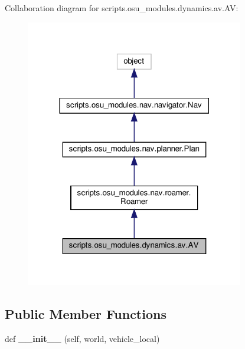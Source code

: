 Collaboration diagram for scripts.\+osu\+\_\+modules.\+dynamics.\+av.\+AV\+:
\nopagebreak
\begin{figure}[H]
\begin{center}
\leavevmode
\includegraphics[width=269pt]{d5/db2/classscripts_1_1osu__modules_1_1dynamics_1_1av_1_1AV__coll__graph}
\end{center}
\end{figure}
\subsection*{Public Member Functions}
\begin{DoxyCompactItemize}
\item 
\mbox{\label{classscripts_1_1osu__modules_1_1dynamics_1_1av_1_1AV_a89f85341e7a2c217b2e394eb0f9d8816}} 
def {\bfseries \+\_\+\+\_\+init\+\_\+\+\_\+} (self, world, vehicle\+\_\+local)
\end{DoxyCompactItemize}
